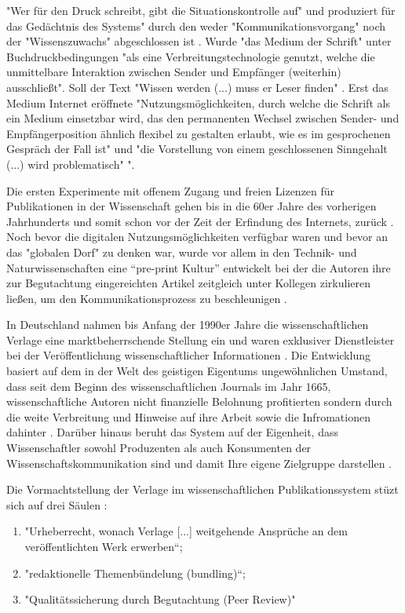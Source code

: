 "Wer für den Druck schreibt, gibt die Situationskontrolle auf" und produziert für das Gedächtnis des Systems" durch den weder "Kommunikationsvorgang" noch der "Wissenszuwachs" abgeschlossen ist \cite{Luhmann1998}. Wurde "das Medium der Schrift" unter Buchdruckbedingungen "als eine Verbreitungstechnologie genutzt, welche die unmittelbare Interaktion zwischen Sender und Empfänger (weiterhin) ausschließt". Soll der Text "Wissen werden (...) muss er Leser finden" \cite{Luhmann1998}. Erst das Medium Internet eröffnete "Nutzungsmöglichkeiten, durch welche die Schrift als ein Medium einsetzbar wird, das den permanenten Wechsel zwischen Sender- und Empfängerposition ähnlich flexibel zu gestalten erlaubt, wie es im gesprochenen Gespräch der Fall ist" und "die Vorstellung von einem geschlossenen Sinngehalt (...) wird problematisch" \cite{sandbothe_2000_pragmatische}". 

Die ersten Experimente mit offenem Zugang und freien Lizenzen für Publikationen in der Wissenschaft gehen bis in die 60er Jahre des vorherigen Jahrhunderts und somit schon vor der Zeit der Erfindung des Internets, zurück \cite{cite:18b}. Noch bevor die digitalen Nutzungsmöglichkeiten verfügbar waren und bevor an das "globalen Dorf"\cite{mcluhan_1962_gutenberg} zu denken war, wurde vor allem in den Technik- und Naturwissenschaften eine “pre-print Kultur” entwickelt bei der die Autoren ihre zur Begutachtung eingereichten Artikel zeitgleich unter Kollegen zirkulieren ließen, um den Kommunikationsprozess zu beschleunigen \cite{suchen-Hoffmann-Zugang-undVerwertung-öffentlicher-Informationen}. 

In Deutschland nahmen bis Anfang der 1990er Jahre die wissenschaftlichen Verlage eine marktbeherrschende Stellung ein und waren exklusiver Dienstleister bei der Veröffentlichung wissenschaftlicher Informationen \cite{schloegl_2005} \cite{offhaus_2012_institutionelle_repos}. Die Entwicklung basiert auf dem in der Welt des geistigen Eigentums ungewöhnlichen Umstand, dass seit dem Beginn des wissenschaftlichen Journals im Jahr 1665, wissenschaftliche Autoren nicht finanzielle Belohnung profitierten sondern durch die weite Verbreitung und Hinweise auf ihre Arbeit sowie die Infromationen dahinter \cite{albert_2006_open_implications}. Darüber hinaus beruht das System auf der Eigenheit, dass Wissenschaftler sowohl Produzenten als auch Konsumenten der Wissenschaftskommunikation sind und damit Ihre eigene Zielgruppe darstellen \cite{Hess_2006}.

Die Vormachtstellung der Verlage im wissenschaftlichen Publikationssystem stüzt sich auf drei Säulen \cite{offhaus_2012_institutionelle_repos} \cite{bargheer_2006_open}: 
\begin{enumerate}
\item "Urheberrecht, wonach Verlage [...] weitgehende Ansprüche an dem veröffentlichten Werk erwerben“;
\item "redaktionelle Themenbündelung (bundling)“;
\item "Qualitätssicherung durch Begutachtung (Peer Review)"
\end{enumerate}

